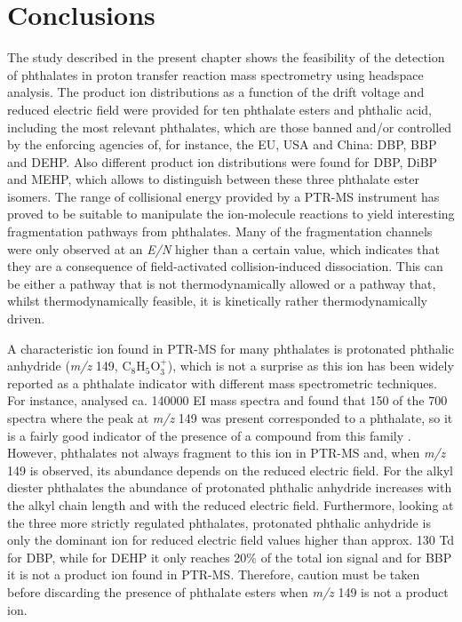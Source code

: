 \section{Conclusions}
The study described in the present chapter shows the feasibility of the detection of phthalates in proton transfer reaction mass spectrometry using headspace analysis. 
%
The product ion distributions as a function of the drift voltage and reduced electric field were provided for ten phthalate esters and phthalic acid, including the most relevant phthalates, which are those banned and/or controlled by the enforcing agencies of, for instance, the EU, USA and China: DBP, BBP and DEHP.
%
Also different product ion distributions were found for  DBP, DiBP and MEHP, which allows to distinguish between these three phthalate ester isomers.
%
The range of collisional energy provided by a PTR-MS instrument has proved to be suitable to manipulate the ion-molecule reactions to yield interesting fragmentation pathways from phthalates.
%
Many of the fragmentation channels were only observed at an \textit{E/N} higher than a certain value, which indicates that they are a consequence of field-activated collision-induced dissociation.
%
This can be either a pathway that is not thermodynamically allowed or a pathway that, whilst thermodynamically feasible, it is kinetically rather thermodynamically driven.


A characteristic ion found in PTR-MS for many phthalates is protonated phthalic anhydride (\textit{m/z} 149, C$_8$H$_5$O$_3^+$), which is not a surprise as this ion has been widely reported as a phthalate indicator with different mass spectrometric techniques. 
For instance, \citeauthor{mclafferty1989registry} analysed  ca. 140000  EI mass spectra and found that 150 of the 700 spectra where the peak at \textit{m/z} 149  was present corresponded to a phthalate,  so it is a fairly good indicator of the presence of a compound from this family \cite{mclafferty1993interpretation,mclafferty1989registry}. 
%
However, phthalates not always fragment to this ion in PTR-MS and, when \textit{m/z} 149 is observed, its abundance depends on  the reduced electric field. For the alkyl diester phthalates the abundance of protonated phthalic anhydride  increases with the alkyl chain length and with the reduced electric field.
%
Furthermore, looking at the three more strictly regulated phthalates, protonated phthalic anhydride is only the dominant ion for reduced electric field values higher than approx. 130 Td for DBP, while for DEHP it  only reaches  20\% of the total ion signal and for BBP it is not a product ion found in PTR-MS.
%
Therefore, %
caution must be taken before discarding the presence of phthalate esters when \textit{m/z} 149 is not a product ion.





